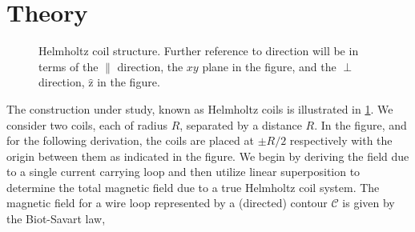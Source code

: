\documentclass[10pt, twocolumn]{article}
\theoremstyle{definition}
\newcommand{\bv}[1]{\bm{\mathrm{#1}}}
\newcommand{\uz}{\bv{\hat{z}}}
\begin{document}
\section{Theory}
  \begin{figure}[H]
    \centering
    \begin{subfigure}[t]{0.5\textwidth}
      \centering
    \end{subfigure}%
    \caption{Helmholtz coil structure. Further reference to direction will be in terms of the $\parallel$ direction, the $xy$ plane in the figure, and the $\perp$ direction, $\uz$ in the figure.}
    \label{diagram:coils}
  \end{figure}
The construction under study, known as Helmholtz coils  is illustrated in \cref{diagram:coils}. We consider two coils, each of radius $R$, separated by a distance $R$. In the figure, and for the following derivation, the coils are placed at $\pm R/2$ respectively with the origin between them as indicated in the figure. We begin by deriving the field due to a single current carrying loop and then utilize linear superposition to determine the total magnetic field due to a true Helmholtz coil system. The magnetic field for a wire loop represented by a (directed) contour $\mathcal{C}$ is given by the Biot-Savart law,
\end{document}
